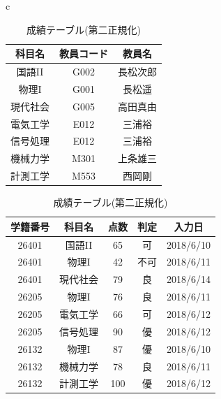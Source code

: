 \documentclass[a4j]{jarticle}
\begin{document}
    \begin{table}[H]
      \begin{center}
        \begin{tabular}{c}

          \begin{minipage}{0.5\hsize}
      \caption{科目テーブル(第二正規化)}
      \label{one2B}
      \begin{center}
        \begin{tabular}{c|c|c}\hline
          科目名 & 教員コード & 教員名 \\ \hline \hline
          国語II & G002 & 長松次郎 \\ \hline
          物理I & G001 & 長松遥 \\ \hline
          現代社会 & G005 & 高田真由 \\ \hline
          電気工学 & E012 & 三浦裕 \\ \hline
          信号処理 & E012 & 三浦裕 \\ \hline
          機械力学 & M301 & 上条雄三 \\ \hline
          計測工学 & M553 & 西岡剛 \\ \hline
        \end{tabular}
      \end{center}
    \end{minipage}

    \begin{minipage}{0.5\hsize}
        \caption{成績テーブル(第二正規化)}
        \label{one2C}
        \begin{center}
          \begin{tabular}{c|c|c|c|c}\hline
            学籍番号 & 科目名 & 点数 & 判定 & 入力日 \\ \hline \hline
26401 & 国語II & 65 & 可 & 2018/6/10 \\ \hline
26401 & 物理I & 42 & 不可 & 2018/6/11 \\ \hline
26401 & 現代社会 & 79 & 良 & 2018/6/14 \\ \hline
26205 & 物理I & 76 & 良 & 2018/6/11 \\ \hline
26205 & 電気工学 & 66 & 可 & 2018/6/12 \\ \hline
26205 & 信号処理 & 90 & 優 & 2018/6/12 \\ \hline
26132 & 物理I & 87 & 優 & 2018/6/10 \\ \hline
26132 & 機械力学 & 78 & 良 & 2018/6/11 \\ \hline
26132 & 計測工学 & 100 & 優 & 2018/6/12 \\ \hline
          \end{tabular}
        \end{center}
      \end{minipage}
    \end{tabular}
  \end{center}
        \end{table}
    
\end{document}
